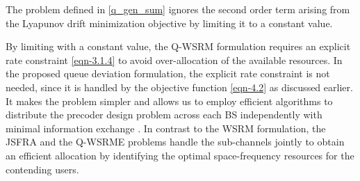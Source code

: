 The problem defined in \eqref{q_gen_sum} ignores the second order term arising from the Lyapunov drift minimization objective by limiting it to a constant value. 

By limiting  with a constant value, the \ac{Q-WSRM} formulation requires an explicit rate constraint \eqref{eqn-3.1.4} to avoid over-allocation of the available resources. In the proposed queue deviation formulation, the explicit rate constraint is not needed, since it is handled by the objective function \eqref{eqn-4.2} as discussed earlier. It makes the problem simpler and allows us to employ efficient algorithms to distribute the precoder design problem across each \ac{BS} independently with minimal information exchange \cite{boyd2011distributed}. In contrast to the \ac{WSRM} formulation, the \ac{JSFRA} and the \ac{Q-WSRME} problems handle the sub-channels jointly to obtain an efficient allocation by identifying the optimal space-frequency resources for the contending users.
